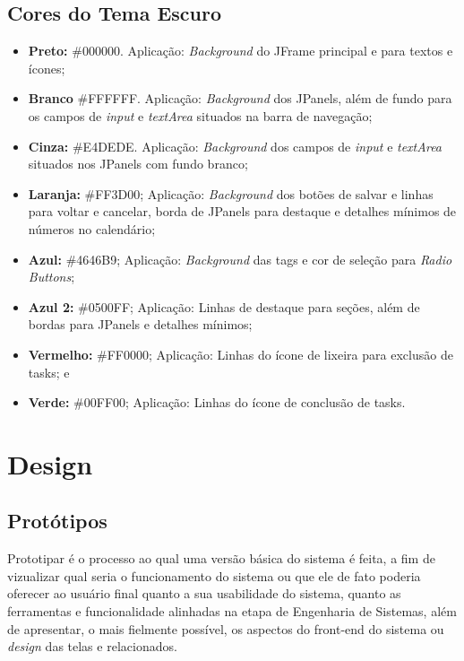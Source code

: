 \documentclass[a4paper,12pt]{article}
\begin{document}
\subsection{Cores do Tema Escuro}
\begin{itemize}
	\item \textbf{Preto:} \#000000. Aplicação: \textit{Background} do JFrame principal e para textos e ícones;
	\item \textbf{Branco} \#FFFFFF. Aplicação: \textit{Background} dos JPanels, além de fundo para os campos de \textit{input} e \textit{textArea} 
	situados na barra de navegação;
	\item \textbf{Cinza:} \#E4DEDE. Aplicação: \textit{Background} dos campos de \textit{input} e \textit{textArea} situados nos JPanels com fundo branco;
	\item \textbf{Laranja:} \#FF3D00; Aplicação: \textit{Background} dos botões de salvar e linhas para voltar e cancelar, borda de JPanels para 
	destaque e detalhes mínimos de números no calendário;
	\item \textbf{Azul:} \#4646B9; Aplicação: \textit{Background} das tags e cor de seleção para \textit{Radio Buttons};
	\item \textbf{Azul 2:} \#0500FF; Aplicação: Linhas de destaque para seções, além de bordas para JPanels e detalhes mínimos;
	\item \textbf{Vermelho:} \#FF0000; Aplicação: Linhas do ícone de lixeira para exclusão de tasks; e
	\item \textbf{Verde:} \#00FF00; Aplicação: Linhas do ícone de conclusão de tasks.
	
\end{itemize}

\pagebreak
\section{Design}
\subsection{Protótipos}
Prototipar é o processo ao qual uma versão básica do sistema é feita, a fim de vizualizar qual seria o funcionamento do sistema ou que 
ele de fato poderia oferecer ao usuário final quanto a sua usabilidade do sistema, quanto as ferramentas e funcionalidade alinhadas 
na etapa de Engenharia de Sistemas, além de apresentar, o mais fielmente possível, os aspectos do front-end do sistema 
ou \textit{design} das telas e relacionados.
\end{document}
